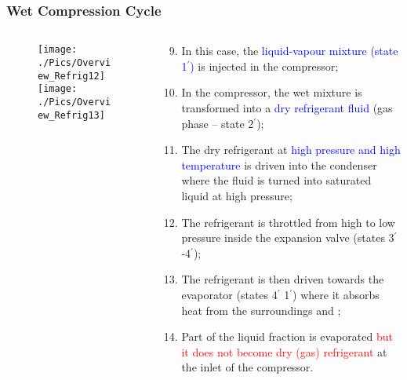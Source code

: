\documentclass[10pt,compress,handout,unknownkeysallowed]{beamer}
\begin{document}
\begin{frame}
 \frametitle{Wet Compression Cycle} 
  \begin{columns}
   \begin{column}[c]{0.5\linewidth}
    \begin{figure}%
     \vbox{
      \texttt{[image: ./Pics/Overview\_Refrig12]}
      \vspace{-.5cm}
      \texttt{[image: ./Pics/Overview\_Refrig13]}}
    \end{figure}  
   \end{column}  
   \begin{column}[c]{0.5\linewidth}
  \begin{enumerate}[(1)] \setcounter{enumi}{8}\scriptsize
     \item <1-> In this case, the \textcolor{blue}{liquid-vapour mixture (state 1$^{\prime}$)} is injected in the compressor;
     \item <1-> In the compressor, the wet mixture is transformed into a \textcolor{blue}{dry refrigerant fluid} (gas phase -- state 2$^{\prime}$);
     \item <1-> The dry refrigerant at \textcolor{blue}{high pressure and high temperature} is driven into the condenser where the fluid is turned into saturated liquid at high pressure;
     \item <1-> The refrigerant is throttled from high to low pressure inside the expansion valve (states 3$^{\prime}$-4$^{\prime}$);
     \item <1-> The refrigerant is then driven towards the evaporator (states 4$^{\prime}$ 1$^{\prime}$) where it absorbs heat from the surroundings and ;
     \item <1-> Part of the liquid fraction is evaporated \textcolor{red}{but it does not become dry (gas) refrigerant} at the inlet of the compressor.

  \end{enumerate}
 \end{column}  
\end{columns}
\end{frame}
\end{document}
